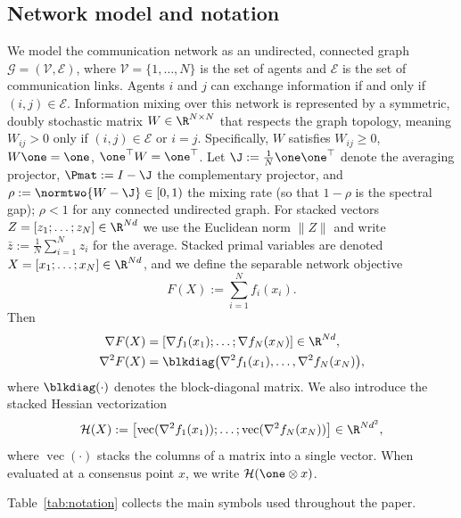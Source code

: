\documentclass[review,onefignum,onetabnum]{siamart171218}
\begin{document}
	\subsection{Network model and notation}
	We model the communication network as an undirected, connected
	graph $\mathcal{G} = (\mathcal{V}, \mathcal{E})$, where
	$\mathcal{V} = \{1, \dots, N\}$ is the set of agents and
	$\mathcal{E}$ is the set of communication links.
	Agents $i$ and $j$ can exchange information if and only if
	$(i,j) \in \mathcal{E}$.
	Information mixing over this network is represented by a symmetric,
	doubly stochastic matrix $W \in \R^{N \times N}$ that respects
	the graph topology, meaning $W_{ij} > 0$ only if
	$(i,j) \in \mathcal{E}$ or $i=j$.
	Specifically, $W$ satisfies
	$W_{ij}\ge0$, $W\one=\one$, $\one^\top W=\one^\top$.
	Let $\J:=\frac{1}{N}\one\one^\top$ denote the averaging projector,
	$\Pmat:=I-\J$ the complementary projector, and
	$\rho := \normtwo{W-\J}\in[0,1)$ the mixing rate (so that $1{-}\rho$ is the spectral gap);
	$\rho<1$ for any connected undirected graph.
	For stacked vectors $Z=[z_1;\dots;z_N]\in\R^{Nd}$ we use the
	Euclidean norm $\|Z\|$ and write $\bar z:=\frac1N\sum_{i=1}^N z_i$
	for the average.
	Stacked primal variables are denoted
	$X=[x_1;\dots;x_N]\in\R^{Nd}$, and we define the separable
	network objective
	\[
	F(X):=\sum_{i=1}^N f_i(x_i).
	\]
	Then
	\begin{align*}
		\nabla F(X)&=[\nabla f_1(x_1);\dots;\nabla f_N(x_N)]\in\R^{Nd},\\
		\nabla^2 F(X)&=\blkdiag\bigl(\nabla^2 f_1(x_1),\dots,\nabla^2 f_N(x_N)\bigr),
	\end{align*}
	where $\blkdiag(\cdot)$ denotes the block-diagonal matrix.
	We also introduce the stacked Hessian vectorization
	\[
	\mathcal H(X):=\bigl[\operatorname{vec}(\nabla^2 f_1(x_1));\dots;\operatorname{vec}(\nabla^2 f_N(x_N))\bigr]\in\R^{Nd^2},
	\]
	where $\operatorname{vec}(\cdot)$ stacks the columns of a matrix into a single vector.
	When evaluated at a consensus point $x$, we write $\mathcal H(\one\otimes x)$.
	
	Table~\ref{tab:notation} collects the main symbols used
	throughout the paper.
	
\end{document}
